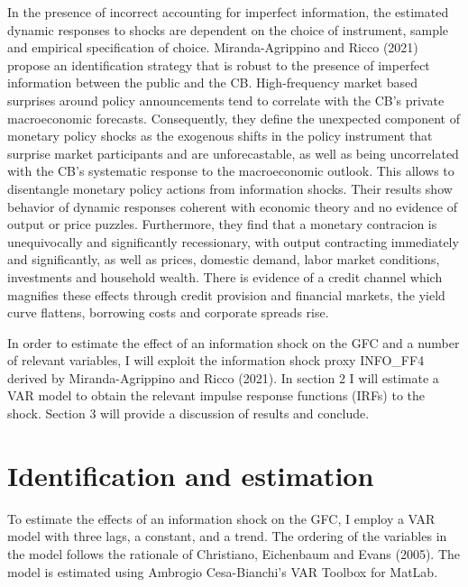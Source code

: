 \documentclass[11pt,a4paper]{article}
\begin{document}
In the presence of incorrect accounting for imperfect information, the estimated dynamic responses to shocks are dependent on the choice of instrument, sample and empirical specification of choice. Miranda-Agrippino and Ricco (2021) propose an identification strategy that is robust to the presence of imperfect information between the public and the CB.
High-frequency market based surprises around policy announcements tend to correlate with the CB's private macroeconomic forecasts. Consequently, they define the unexpected component of monetary policy shocks as the exogenous shifts in the policy instrument that surprise market participants and are unforecastable, as well as being uncorrelated with the CB's systematic response to the macroeconomic outlook.  This allows to disentangle monetary policy actions from information shocks. 
Their results show behavior of dynamic responses coherent with economic theory and no evidence of output or price puzzles. Furthermore, they find that a monetary contracion is unequivocally and significantly recessionary, with output contracting immediately and significantly, as well as prices, domestic demand, labor market conditions, investments and household wealth. There is evidence of a credit channel which magnifies these effects through credit provision and financial markets, the yield curve flattens, borrowing costs and corporate spreads rise.


In order to estimate the effect of an information shock on the GFC and a number of relevant variables, I will exploit the information shock proxy INFO\_FF4 derived by Miranda-Agrippino and Ricco (2021).
In section 2 I will estimate a VAR model to obtain the relevant impulse response functions (IRFs) to the shock.
Section 3 will provide a discussion of results and conclude.



\section{Identification and estimation}
To estimate the effects of an information shock on the GFC, I employ a VAR model with three lags, a constant, and a trend. The ordering of the variables in the model follows the rationale of Christiano, Eichenbaum and Evans (2005). The model is estimated using Ambrogio Cesa-Bianchi's VAR Toolbox for MatLab.
\end{document}
